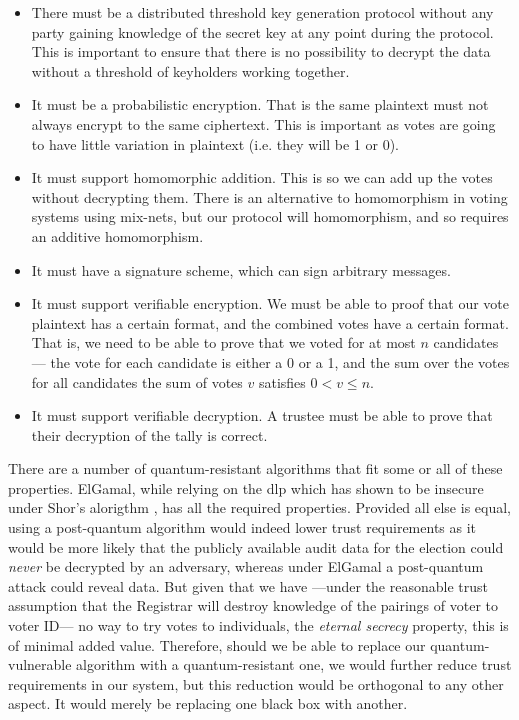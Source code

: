 \begin{itemize}
    \item There must be a distributed threshold key generation protocol without any party gaining knowledge of the secret key at any point during the protocol. This is important to ensure that there is no possibility to decrypt the data without a threshold of keyholders working together.
    \item It must be a probabilistic encryption. That is the same plaintext must not always encrypt to the same ciphertext. This is important as votes are going to have little variation in plaintext (i.e. they will be 1 or 0).
    \item It must support homomorphic addition. This is so we can add up the votes without decrypting them. There is an alternative to homomorphism in voting systems using mix-nets, but our protocol will homomorphism, and so requires an additive homomorphism.
    \item It must have a signature scheme, which can sign arbitrary messages.
    \item It must support verifiable encryption. We must be able to proof that our vote plaintext has a certain format, and the combined votes have a certain format. That is, we need to be able to prove that we voted for at most $n$ candidates --- the vote for each candidate is either a 0 or a 1, and the sum over the votes for all candidates the sum of votes $v$ satisfies $0 < v \leq n$.
    \item It must support verifiable decryption. A trustee must be able to prove that their decryption of the tally is correct.
\end{itemize}

There are a number of quantum-resistant algorithms  that fit some or all of these properties. ElGamal, while relying on the \gls{dlp} which has shown to be insecure under Shor's alorigthm \cite{shorAlgorithmsQuantumComputation1994}, has all the required properties. Provided all else is equal, using a post-quantum algorithm would indeed lower trust requirements as it would be more likely that the publicly available audit data for the election could \emph{never} be decrypted by an adversary, whereas under ElGamal a post-quantum attack could reveal data. But given that we have ---under the reasonable trust assumption that the Registrar will destroy knowledge of the pairings of voter to voter ID--- no way to try votes to individuals, the \emph{eternal secrecy} property, this is of minimal added value. Therefore, should we be able to replace our quantum-vulnerable algorithm with a quantum-resistant one, we would further reduce trust requirements in our system, but this reduction would be orthogonal to any other aspect. It would merely be replacing one black box with another.

